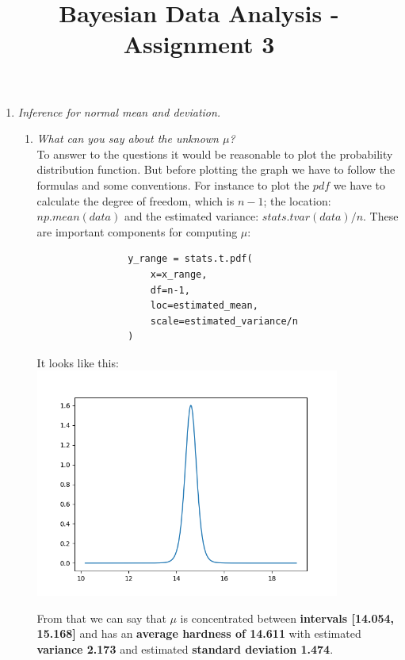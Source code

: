 \documentclass[11pt,a4paper,english]{article}
\title{Bayesian Data Analysis - Assignment 3}
\author{}
\begin{document}
      \maketitle

      \begin{enumerate}
        \item \textit{Inference for normal mean and deviation.}
          \begin{enumerate}[label=\alph*.]
            \item \textit{What can you say about the unknown $\mu$?}\\
              To answer to the questions it would be reasonable to plot the probability
              distribution function. But before plotting the graph we have to follow the formulas
              and some conventions. For instance to plot the $pdf$ we have to calculate the
              degree of freedom, which is $n-1$; the location: $np.mean(data)$ and the
              estimated variance: $stats.tvar(data)/n$. These are important components for
              computing $\mu$:
              \begin{verbatim}
                y_range = stats.t.pdf(
                    x=x_range,
                    df=n-1,
                    loc=estimated_mean,
                    scale=estimated_variance/n
                )
              \end{verbatim}

              It looks like this:\\
              \includegraphics[width=10cm]{3_1_a_mean_student_distribution.png}

              From that we can say that $\mu$ is concentrated between \textbf{intervals [14.054, 15.168]}
              and has an \textbf{average hardness of 14.611} with estimated \textbf{variance 2.173} and
              estimated \textbf{standard deviation 1.474}.


\end{enumerate}
\end{enumerate}
\end{document}
